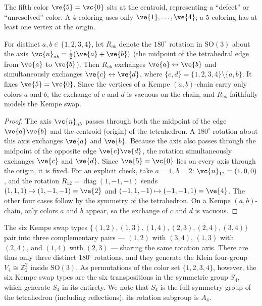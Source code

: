 The fifth color $\ve{5} = \vc{0}$ sits at the centroid, representing a
``defect'' or ``unresolved'' color. A 4-coloring uses only
$\ve{1}, \ldots, \ve{4}$; a 5-coloring has at least one vertex at the
origin.

\begin{proposition}\label{prop:kempe-rotation}
For distinct $a, b \in \{1,2,3,4\}$, let $R_{ab}$ denote the
$180^\circ$ rotation in $\mathrm{SO}(3)$ about the axis
$\vc{n}_{ab} = \frac{1}{2}(\ve{a} + \ve{b})$ (the midpoint of the
tetrahedral edge from $\ve{a}$ to $\ve{b}$). Then $R_{ab}$ exchanges
$\ve{a} \leftrightarrow \ve{b}$ and simultaneously exchanges
$\ve{c} \leftrightarrow \ve{d}$, where
$\{c,d\} = \{1,2,3,4\} \setminus \{a,b\}$. It fixes
$\ve{5} = \vc{0}$. Since the vertices of a Kempe $(a,b)$-chain carry
only colors $a$ and $b$, the exchange of $c$ and $d$ is vacuous on the
chain, and $R_{ab}$ faithfully models the Kempe swap.
\end{proposition}

\begin{proof}
The axis $\vc{n}_{ab}$ passes through both the midpoint of the
edge $\ve{a}\ve{b}$ and the centroid (origin) of the tetrahedron.
A $180^\circ$ rotation about this axis exchanges $\ve{a}$ and
$\ve{b}$. Because the axis also passes through the midpoint of the
opposite edge $\ve{c}\ve{d}$, the rotation simultaneously exchanges
$\ve{c}$ and $\ve{d}$. Since $\ve{5} = \vc{0}$ lies on every axis
through the origin, it is fixed. For an explicit check, take
$a = 1$, $b = 2$: $\vc{n}_{12} = (1, 0, 0)$, and the rotation
$R_{12} = \operatorname{diag}(1, -1, -1)$ sends
$(1,1,1) \mapsto (1,-1,-1) = \ve{2}$ and
$(-1,1,-1) \mapsto (-1,-1,1) = \ve{4}$. The other four cases
follow by the symmetry of the tetrahedron. On a Kempe $(a,b)$-chain,
only colors $a$ and $b$ appear, so the exchange of $c$ and $d$ is
vacuous.
\end{proof}

The six Kempe swap types $\{(1,2), (1,3), (1,4), (2,3), (2,4),
(3,4)\}$ pair into three complementary pairs — $(1,2)$ with $(3,4)$,
$(1,3)$ with $(2,4)$, and $(1,4)$ with $(2,3)$ — sharing the same
rotation axis. There are thus only three distinct $180^\circ$
rotations, and they generate the Klein four-group
$V_4 \cong \mathbb{Z}_2^2$ inside $\mathrm{SO}(3)$. As permutations
of the color set $\{1,2,3,4\}$, however, the six Kempe swap types
are the six transpositions in the symmetric group $S_4$, which
generate $S_4$ in its entirety. We note that $S_4$ is the full
symmetry group of the tetrahedron (including reflections); its
rotation subgroup is $A_4$.

